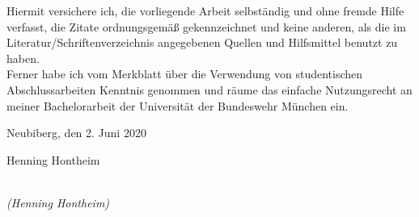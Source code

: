 \newpage

\thispagestyle{empty}

\begin{large}

\vspace*{2cm}

\noindent
Hiermit versichere ich, die vorliegende Arbeit selbständig und ohne fremde Hilfe verfasst, die Zitate ordnungsgemäß gekennzeichnet und keine anderen, als die im Literatur/Schriftenverzeichnis angegebenen Quellen und Hilfsmittel benutzt zu haben.\\[2em]
\noindent
Ferner habe ich vom Merkblatt über die Verwendung von studentischen Abschlussarbeiten Kenntnis genommen und räume das einfache Nutzungsrecht an meiner Bachelorarbeit der Universität der Bundeswehr München ein.

\vspace{2cm}

\noindent
Neubiberg, den 2. Juni 2020

\vspace{3cm}

\hfill
\begin{minipage}{8cm}
\centering
\begin{Large}
{\selectfont Henning Hontheim}\\
\end{Large}
\hspace*{0cm}
\dotfill\\
\hspace*{0cm}
\textit{(Henning Hontheim)}
\end{minipage}
\end{large}